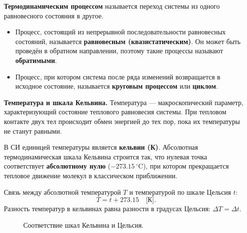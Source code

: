 \begin{definition}
\textbf{Термодинамическим процессом} называется переход системы из одного равновесного состояния в другое.
\begin{itemize}
    \item Процесс, состоящий из непрерывной последовательности равновесных состояний, называется \textbf{равновесным (квазистатическим)}. Он может быть проведён в обратном направлении, поэтому такие процессы называют \textbf{обратимыми}.
    \item Процесс, при котором система после ряда изменений возвращается в исходное состояние, называется \textbf{круговым процессом} или \textbf{циклом}.
\end{itemize}
\end{definition}

\begin{remark}
\textbf{Температура и шкала Кельвина.} Температура --- макроскопический параметр, характеризующий состояние теплового равновесия системы. При тепловом контакте двух тел происходит обмен энергией до тех пор, пока их температуры не станут равными.
\par\noindent В СИ единицей температуры является \textbf{кельвин (К)}. Абсолютная термодинамическая шкала Кельвина строится так, что нулевая точка соответствует \textbf{абсолютному нулю} ($-273.15\,^\circ\text{C}$), при котором прекращается тепловое движение молекул в классическом приближении.
\par\noindent Связь между абсолютной температурой $T$ и температурой по шкале Цельсия $t$:
\begin{equation}
    T = t + 273.15 \quad \text{[К]}. \label{eq:temp_scale_35}
\end{equation}
Разность температур в кельвинах равна разности в градусах Цельсия: $\Delta T = \Delta t$.
\end{remark}

\begin{figure}[H]
\centering
{}
\caption{Соответствие шкал Кельвина и Цельсия.}
\end{figure}
